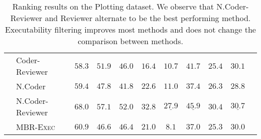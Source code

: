 \documentclass[nohyperref]{article}
\theoremstyle{plain}
\theoremstyle{definition}
\theoremstyle{remark}
\begin{document}
\begin{table*}[]
\begin{tabular}{l|lccccccccc}
    & Coder-Reviewer &              $58.3$ &              $51.9$ &              $46.0$ &           $16.4$ &              $10.7$ &              $41.7$ &              $25.4$ &              $30.1$ \\
\cmidrule{2-10}
    & N.Coder &              $59.4$ &              $47.8$ &              $41.8$ &           $22.6$ &              $11.0$ &              $37.4$ &              $26.3$ &              $28.8$ \\
    & N.Coder-Reviewer &     $\mathbf{68.0}$ &     $\mathbf{57.1}$ &     $\mathbf{52.0}$ &           $32.8$ &  $\underline{27.9}$ &  $\underline{45.9}$ &              $30.4$ &  $\underline{30.7}$ \\
\cmidrule{2-10}
    & MBR-\textsc{Exec} &              $60.9$ &              $46.6$ &              $46.4$ &           $21.0$ &               $8.1$ &              $37.0$ &              $25.3$ &              $30.0$ \\
\bottomrule
\end{tabular}
 \caption{
Ranking results on the Plotting dataset. We observe that N.Coder-Reviewer and Reviewer alternate to be the best performing method. Executability filtering improves most methods and does not change the comparison between methods.
}
\label{tab:app_plotting_exec}
\end{table*}
\end{document}
